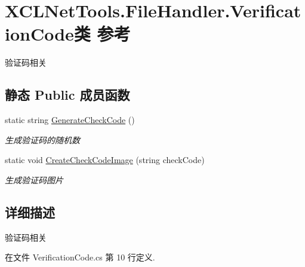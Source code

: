 \hypertarget{class_x_c_l_net_tools_1_1_file_handler_1_1_verification_code}{\section{X\-C\-L\-Net\-Tools.\-File\-Handler.\-Verification\-Code类 参考}
\label{class_x_c_l_net_tools_1_1_file_handler_1_1_verification_code}
}


验证码相关  


\subsection*{静态 Public 成员函数}
\begin{DoxyCompactItemize}
\item 
static string \hyperlink{class_x_c_l_net_tools_1_1_file_handler_1_1_verification_code_af4beced22b07b395e6ae37452a895f32}{Generate\-Check\-Code} ()
\begin{DoxyCompactList}\small\item\em 生成验证码的随机数 \end{DoxyCompactList}\item 
static void \hyperlink{class_x_c_l_net_tools_1_1_file_handler_1_1_verification_code_acde0d83935e0d55da7a29725026a72e9}{Create\-Check\-Code\-Image} (string check\-Code)
\begin{DoxyCompactList}\small\item\em 生成验证码图片 \end{DoxyCompactList}\end{DoxyCompactItemize}


\subsection{详细描述}
验证码相关 



在文件 Verification\-Code.\-cs 第 10 行定义.



